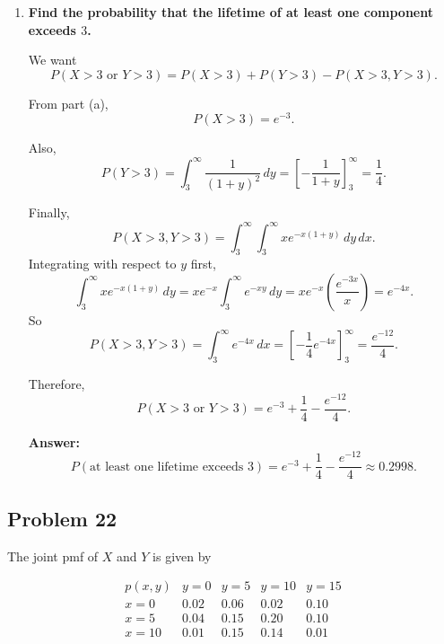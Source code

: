 \begin{enumerate}
    \item[(c)] \textbf{Find the probability that the lifetime of at least one component exceeds $3$.}

    We want
    \[
    P(X>3 \text{ or } Y>3)=P(X>3)+P(Y>3)-P(X>3,Y>3).
    \]

    From part (a),
    \[
    P(X>3)=e^{-3}.
    \]

    Also,
    \[
    P(Y>3)=\int_3^\infty \frac{1}{(1+y)^2}\,dy
    =\left[-\frac{1}{1+y}\right]_3^\infty
    =\frac14.
    \]

    Finally,
    \[
    P(X>3,Y>3)=\int_3^\infty\int_3^\infty x e^{-x(1+y)}\,dy\,dx.
    \]
    Integrating with respect to $y$ first,
    \[
    \int_3^\infty x e^{-x(1+y)}\,dy
    =x e^{-x}\int_3^\infty e^{-xy}\,dy
    =x e^{-x}\left(\frac{e^{-3x}}{x}\right)=e^{-4x}.
    \]
    So
    \[
    P(X>3,Y>3)=\int_3^\infty e^{-4x}\,dx
    =\left[-\frac14 e^{-4x}\right]_3^\infty
    =\frac{e^{-12}}{4}.
    \]

    Therefore,
    \[
    P(X>3 \text{ or } Y>3)=e^{-3}+\frac14-\frac{e^{-12}}{4}.
    \]

    \textbf{Answer:}
    \[
    P(\text{at least one lifetime exceeds }3)=e^{-3}+\frac14-\frac{e^{-12}}{4}\approx 0.2998.
    \]
\end{enumerate}

\subsection*{Problem 22}

The joint pmf of $X$ and $Y$ is given by

\[
\begin{array}{c|cccc}
p(x,y) & y=0 & y=5 & y=10 & y=15\\
\hline
x=0 & 0.02 & 0.06 & 0.02 & 0.10\\
x=5 & 0.04 & 0.15 & 0.20 & 0.10\\
x=10 & 0.01 & 0.15 & 0.14 & 0.01
\end{array}
\]

